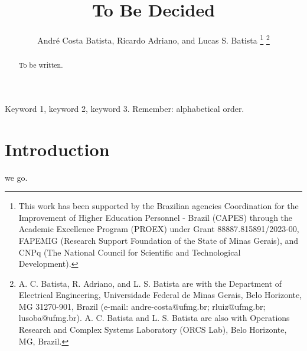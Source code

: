 \documentclass{IEEEtran}
\begin{document}
    \title{To Be Decided}
    \author{Andr\'e Costa Batista, Ricardo Adriano, and Lucas S. Batista
        \thanks{This work has been supported by the Brazilian agencies Coordination for the Improvement of Higher Education Personnel - Brazil (CAPES) through the Academic Excellence Program (PROEX) under Grant 88887.815891/2023-00, FAPEMIG (Research Support Foundation of the State of Minas Gerais), and CNPq (The National Council for Scientific and Technological Development).}
        \thanks{A. C. Batista, R. Adriano, and L. S. Batista are with the Department of Electrical Engineering, Universidade Federal de Minas Gerais, Belo Horizonte, MG 31270-901, Brazil (e-mail: andre-costa@ufmg.br; rluiz@ufmg.br; lusoba@ufmg.br). A. C. Batista and L. S. Batista are also with Operations Research and Complex Systems Laboratory (ORCS Lab), Belo Horizonte, MG, Brazil.}}
   
    \maketitle
    
    \begin{abstract}
        To be written.
    \end{abstract}
    
    \begin{IEEEkeywords}
        Keyword 1, keyword 2, keyword 3. Remember: alphabetical order.
    \end{IEEEkeywords}
    
    \section{Introduction}\label{sec:introduction}
    
         we go.
        
        
        
        
        
        
\end{document}
